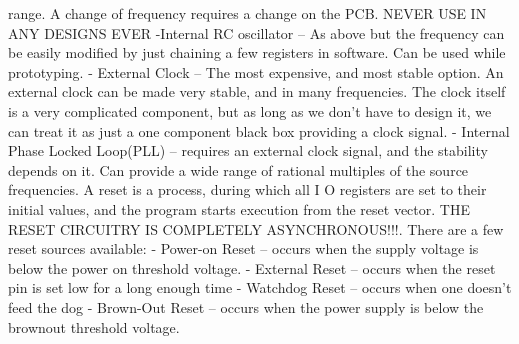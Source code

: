                                range. A change of frequency requires a change on the PCB. \newline
                               NEVER USE IN ANY DESIGNS EVER \newline
     -Internal RC oscillator -- As above but the frequency can be easily modified by just chaining a few          \newline
                               registers in software. Can be used while prototyping.                              \newline
     - External Clock -- The most expensive, and most stable option. An external clock can be made very           \newline
                        stable, and in many frequencies. The clock itself is a very complicated component,        \newline
                        but as long as we don't have to design it, we can treat it as just a one component        \newline
                        black box providing a clock signal.                                                       \newline
    - Internal Phase Locked Loop(PLL) -- requires an external clock signal, and the stability depends on it.      \newline
                                        Can provide a wide range of rational multiples of the source frequencies. \newline
{}
\sol A reset is a process, during which all I O registers are set to their initial values, and the program starts execution from the reset vector.
     THE RESET CIRCUITRY IS COMPLETELY ASYNCHRONOUS!!!.
     There are a few reset sources available:  \newline
     - Power-on Reset -- occurs when the supply voltage is below the power on threshold voltage.  \newline
     - External Reset -- occurs when the reset pin is set low for a long enough time \newline
     - Watchdog Reset -- occurs when one doesn't feed the dog \newline
     - Brown-Out Reset -- occurs when the power supply is below the brownout threshold voltage. \newline

